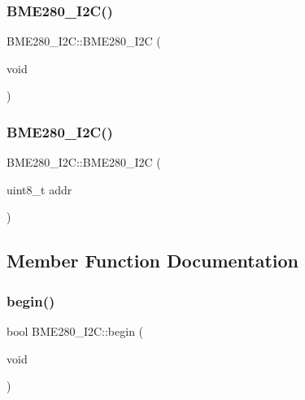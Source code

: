 \subsubsection{\texorpdfstring{B\+M\+E280\+\_\+\+I2\+C()}{BME280\_I2C()}\hspace{0.1cm}{\footnotesize\ttfamily [1/2]}}
{\footnotesize\ttfamily B\+M\+E280\+\_\+\+I2\+C\+::\+B\+M\+E280\+\_\+\+I2C (\begin{DoxyParamCaption}\item[{void}]{ }\end{DoxyParamCaption})}

\mbox{\label{class_b_m_e280___i2_c_a1a304db709f2984767feb9bc91a1b17b}} 
\subsubsection{\texorpdfstring{B\+M\+E280\+\_\+\+I2\+C()}{BME280\_I2C()}\hspace{0.1cm}{\footnotesize\ttfamily [2/2]}}
{\footnotesize\ttfamily B\+M\+E280\+\_\+\+I2\+C\+::\+B\+M\+E280\+\_\+\+I2C (\begin{DoxyParamCaption}\item[{uint8\+\_\+t}]{addr }\end{DoxyParamCaption})}



\subsection{Member Function Documentation}
\mbox{\label{class_b_m_e280___i2_c_ae3831ecd83ad52e596729515cbd96a5a}} 
\subsubsection{\texorpdfstring{begin()}{begin()}}
{\footnotesize\ttfamily bool B\+M\+E280\+\_\+\+I2\+C\+::begin (\begin{DoxyParamCaption}\item[{void}]{ }\end{DoxyParamCaption})}

